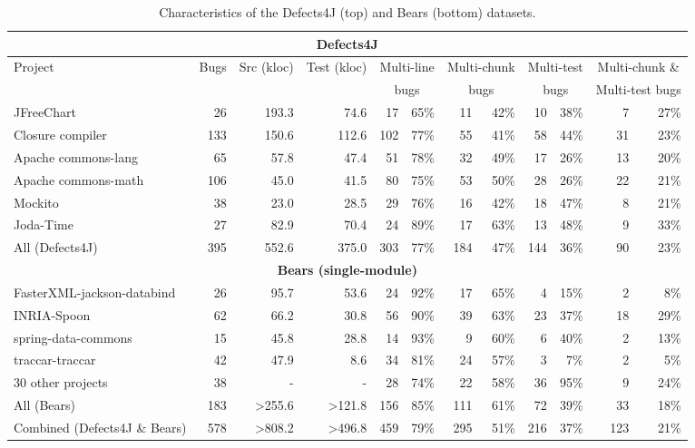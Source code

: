 \documentclass[sigconf, timestamp-false, anonymous=true]{acmart}
\begin{document}
\begin{table*}
\begin{center}
\begin{tabular}{l | rrr | rr | rr | rr | rr}
\toprule
\multicolumn{12}{c}{\textbf{Defects4J}} \\
\midrule
Project & Bugs & Src (kloc) & Test (kloc) & \multicolumn{2}{c}{Multi-line} & \multicolumn{2}{c}{Multi-chunk} 
		& \multicolumn{2}{c}{Multi-test} & \multicolumn{2}{c}{Multi-chunk \&}\\
&&&&\multicolumn{2}{c}{bugs}&\multicolumn{2}{c}{bugs}&\multicolumn{2}{c}{bugs}&\multicolumn{2}{c}{Multi-test bugs}\\
\midrule
JFreeChart  & 26 & 193.3 & 74.6 & 17 & 65\% & 11 & 42\% & 10 & 38\% & 7 & 27\%\\
Closure compiler & 133 & 150.6 & 112.6 & 102 & 77\% & 55 & 41\% & 58 & 44\% & 31 & 23\%\\
Apache commons-lang & 65 & 57.8 & 47.4 & 51 & 78\% & 32 & 49\% & 17 & 26\% & 13 & 20\%\\
Apache commons-math & 106 & 45.0 & 41.5 & 80 & 75\% & 53 & 50\% & 28 & 26\% & 22 & 21\%\\
Mockito & 38 & 23.0 & 28.5 & 29 & 76\% & 16 & 42\% & 18 & 47\% & 8 & 21\%\\
Joda-Time & 27 & 82.9 & 70.4 & 24 & 89\% & 17 & 63\% & 13 & 48\% & 9 & 33\%\\
\midrule
All (Defects4J) & 395 & 552.6 & 375.0 & 303 & 77\% & 184 & 47\% & 144 & 36\% & 90 & 23\%\\
\midrule
\multicolumn{12}{c}{\textbf{Bears (single-module)}} \\
\midrule
FasterXML-jackson-databind & 26 & 95.7 & 53.6 & 24 & 92\% & 17 & 65\% & 4 & 15\% & 2 & 8\%\\
INRIA-Spoon & 62 & 66.2 & 30.8 & 56 & 90\% & 39 & 63\% & 23 & 37\% & 18 & 29\%\\
spring-data-commons & 15 & 45.8 & 28.8 & 14 & 93\% & 9 & 60\% & 6 & 40\% & 2 & 13\%\\
traccar-traccar & 42 & 47.9 & 8.6 & 34 & 81\% & 24 & 57\% & 3 & 7\% & 2 & 5\%\\
30 other projects & 38 & - & - & 28 & 74\% & 22 & 58\% & 36 & 95\% & 9 & 24\%\\
\midrule
All (Bears) & 183 & >255.6 & >121.8 & 156 & 85\% & 111 & 61\% & 72 & 39\% & 33 & 18\% \\
\midrule
Combined (Defects4J \& Bears) & 578 & >808.2 & >496.8 & 459 & 79\% & 295 & 51\% & 216 & 37\% & 123 & 21\%\\
\bottomrule
\end{tabular}
\end{center}
\caption{\label{tab:dataset-characteristics} Characteristics of the Defects4J (top) and Bears (bottom) datasets.}
\end{table*}
\end{document}
